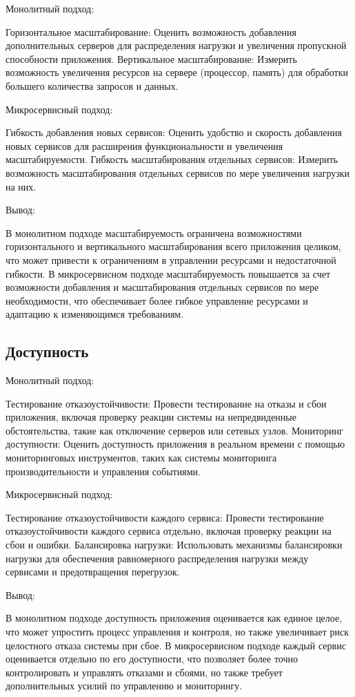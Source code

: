 Монолитный подход:

    Горизонтальное масштабирование: Оценить возможность добавления дополнительных серверов для распределения нагрузки и увеличения пропускной способности приложения.
    Вертикальное масштабирование: Измерить возможность увеличения ресурсов на сервере (процессор, память) для обработки большего количества запросов и данных.

Микросервисный подход:

    Гибкость добавления новых сервисов: Оценить удобство и скорость добавления новых сервисов для расширения функциональности и увеличения масштабируемости.
    Гибкость масштабирования отдельных сервисов: Измерить возможность масштабирования отдельных сервисов по мере увеличения нагрузки на них.

Вывод:

    В монолитном подходе масштабируемость ограничена возможностями горизонтального и вертикального масштабирования всего приложения целиком, что может привести к ограничениям в управлении ресурсами и недостаточной гибкости.
    В микросервисном подходе масштабируемость повышается за счет возможности добавления и масштабирования отдельных сервисов по мере необходимости, что обеспечивает более гибкое управление ресурсами и адаптацию к изменяющимся требованиям.

\subsection{Доступность}

Монолитный подход:

    Тестирование отказоустойчивости: Провести тестирование на отказы и сбои приложения, включая проверку реакции системы на непредвиденные обстоятельства, такие как отключение серверов или сетевых узлов.
    Мониторинг доступности: Оценить доступность приложения в реальном времени с помощью мониторинговых инструментов, таких как системы мониторинга производительности и управления событиями.

Микросервисный подход:

    Тестирование отказоустойчивости каждого сервиса: Провести тестирование отказоустойчивости каждого сервиса отдельно, включая проверку реакции на сбои и ошибки.
    Балансировка нагрузки: Использовать механизмы балансировки нагрузки для обеспечения равномерного распределения нагрузки между сервисами и предотвращения перегрузок.

Вывод:

    В монолитном подходе доступность приложения оценивается как единое целое, что может упростить процесс управления и контроля, но также увеличивает риск целостного отказа системы при сбое.
    В микросервисном подходе каждый сервис оценивается отдельно по его доступности, что позволяет более точно контролировать и управлять отказами и сбоями, но также требует дополнительных усилий по управлению и мониторингу.


